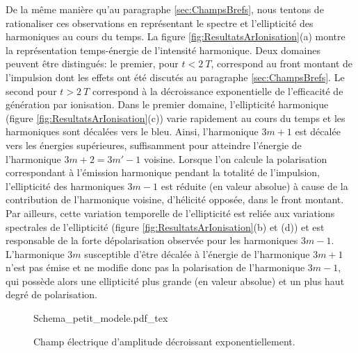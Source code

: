 De la même manière qu'au paragraphe \ref{sec:ChampsBrefs}, nous tentons de rationaliser ces observations en représentant le spectre et l'ellipticité des harmoniques au cours du temps. La figure \ref{fig:ResultatsArIonisation}(a) montre la représentation temps-énergie de l'intensité harmonique. Deux domaines peuvent être distingués: le premier, pour $t < 2\: T$, correspond au front montant de l'impulsion dont les effets ont été discutés au paragraphe \ref{sec:ChampsBrefs}. Le second pour $t > 2 \: T$ correspond à la décroissance exponentielle de l'efficacité de génération par ionisation. Dans le premier domaine, l'ellipticité harmonique (figure \ref{fig:ResultatsArIonisation}(c)) varie rapidement au cours du temps et les harmoniques sont décalées vers le bleu. Ainsi, l'harmonique $3m+1$ est décalée vers les énergies supérieures, suffisamment pour atteindre l'énergie de l'harmonique $3m+2 = 3m'-1$ voisine. Lorsque l'on calcule la polarisation correspondant à l'émission harmonique pendant la totalité de l'impulsion, l'ellipticité des harmoniques $3m-1$ est réduite (en valeur absolue) à cause de la contribution de l'harmonique voisine, d'hélicité opposée, dans le front montant. Par ailleurs, cette variation temporelle de l'ellipticité est reliée aux variations spectrales de l'ellipticité (figure \ref{fig:ResultatsArIonisation}(b) et (d)) et est responsable de la forte dépolarisation observée pour les harmoniques $3m-1$. L'harmonique $3m$ susceptible d'être décalée à l'énergie de l'harmonique $3m+1$ n'est pas émise et ne modifie donc pas la polarisation de l'harmonique $3m-1$, qui possède alors une ellipticité plus grande (en valeur absolue) et un plus haut degré de polarisation. 

\begin{figure}[h]
\centering
\def\svgwidth{0.5\textwidth}
{Schema_petit_modele.pdf_tex}
\caption{Champ électrique d'amplitude décroissant exponentiellement.}
\label{fig:Schema_petit_modele}
\end{figure}


